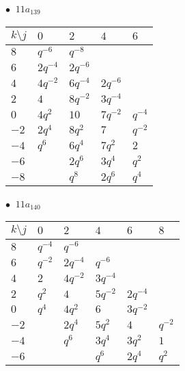 \begin{minipage}{\linewidth}
$\bullet\ $ $11a_{139}$ \vspace{0.5em} \\
\begin{tabular}{l|llll}
$k \setminus j$ & $0$ & $2$ & $4$ & $6$ \\
\hline
$8$ & $q^{-6}$ & $q^{-8}$ &  &  \\
$6$ & $2q^{-4}$ & $2q^{-6}$ &  &  \\
$4$ & $4q^{-2}$ & $6q^{-4}$ & $2q^{-6}$ &  \\
$2$ & $4$ & $8q^{-2}$ & $3q^{-4}$ &  \\
$0$ & $4q^{2}$ & $10$ & $7q^{-2}$ & $q^{-4}$ \\
$-2$ & $2q^{4}$ & $8q^{2}$ & $7$ & $q^{-2}$ \\
$-4$ & $q^{6}$ & $6q^{4}$ & $7q^{2}$ & $2$ \\
$-6$ &  & $2q^{6}$ & $3q^{4}$ & $q^{2}$ \\
$-8$ &  & $q^{8}$ & $2q^{6}$ & $q^{4}$ \\
\end{tabular}
\vspace{2em}
\end{minipage}
%
\begin{minipage}{\linewidth}
$\bullet\ $ $11a_{140}$ \vspace{0.5em} \\
\begin{tabular}{l|lllll}
$k \setminus j$ & $0$ & $2$ & $4$ & $6$ & $8$ \\
\hline
$8$ & $q^{-4}$ & $q^{-6}$ &  &  &  \\
$6$ & $q^{-2}$ & $2q^{-4}$ & $q^{-6}$ &  &  \\
$4$ & $2$ & $4q^{-2}$ & $3q^{-4}$ &  &  \\
$2$ & $q^{2}$ & $4$ & $5q^{-2}$ & $2q^{-4}$ &  \\
$0$ & $q^{4}$ & $4q^{2}$ & $6$ & $3q^{-2}$ &  \\
$-2$ &  & $2q^{4}$ & $5q^{2}$ & $4$ & $q^{-2}$ \\
$-4$ &  & $q^{6}$ & $3q^{4}$ & $3q^{2}$ & $1$ \\
$-6$ &  &  & $q^{6}$ & $2q^{4}$ & $q^{2}$ \\
\end{tabular}
\vspace{2em}
\end{minipage}
%
